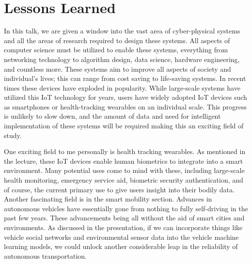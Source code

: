 \documentclass[journal,onecolumn]{IEEEtran}
\begin{document}
\section{Lessons Learned}

In this talk, we are given a window into the vast area of cyber-physical systems and all the areas of research required to design these systems. All aspects of computer science must be utilized to enable these systems, everything from networking technology to algorithm design, data science, hardware engineering, and countless more.
These systems aim to improve all aspects of society and individual's lives; this can range from cost saving to life-saving systems. 
In recent times these devices have exploded in popularity. While large-scale systems have utilized this IoT technology for years, users have widely adopted IoT devices such as smartphones or health-tracking wearables on an individual scale.
This progress is unlikely to slow down, and the amount of data and need for intelligent implementation of these systems will be required making this an exciting field of study. 

One exciting field to me personally is health tracking wearables. As mentioned in the lecture, these IoT devices enable human biometrics to integrate into a smart environment. 
Many potential uses come to mind with these, including large-scale health monitoring, emergency service aid, biometric security authentication, and of course, the current primary use to give users insight into their bodily data. 
Another fascinating field is in the smart mobility section. Advances in autonomous vehicles have essentially gone from nothing to fully self-driving in the past few years. 
These advancements being all without the aid of smart cities and environments. As discussed in the presentation, if we can incorporate things like vehicle social networks and environmental sensor data into the vehicle machine learning models, we could unlock another considerable leap in the reliability of autonomous transportation.


\end{document}
